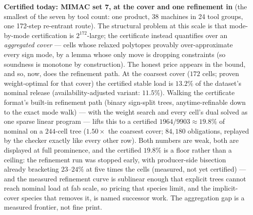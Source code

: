 \textbf{Certified today: MIMAC set 7, at the cover and one
refinement in} (the smallest of the seven by tool count: one product,
38 machines in 24 tool groups, one 172-step re-entrant route). The
structural problem at this scale is that mode-by-mode certification
is $2^{172}$-large; the certificate instead quantifies over an
\emph{aggregated cover} --- cells whose relaxed polytopes provably
over-approximate every sign mode, by a lemma whose only move is
dropping constraints (so soundness is monotone by construction). The
honest price appears in the bound, and so, now, does the refinement
path. At the coarsest cover ($172$ cells; proven weight-optimal for
that cover) the certified stable load is $13.2\%$ of the dataset's
nominal release (availability-adjusted variant: $11.5\%$). Walking
the certificate format's built-in refinement path (binary sign-split
trees, anytime-refinable down to the exact mode walk) --- with the
weight search and every cell's dual solved as one sparse linear
program --- lifts this to a certified $1964/9903 \approx 19.8\%$ of
nominal on a $244$-cell tree ($1.50\times$ the coarsest cover;
$84{,}180$ obligations, replayed by the checker exactly like every
other row). Both numbers are weak, both are displayed at full
prominence, and the certified $19.8\%$ is a floor rather than a
ceiling: the refinement run was stopped early, with producer-side
bisection already bracketing $23$--$24\%$ at five times the cells
(measured, not yet certified) --- and the measured refinement curve
is sublinear enough that explicit trees cannot reach nominal load at
fab scale, so pricing that species limit, and the implicit-cover
species that removes it, is named successor work. The aggregation
gap is a measured frontier, not fine print.

